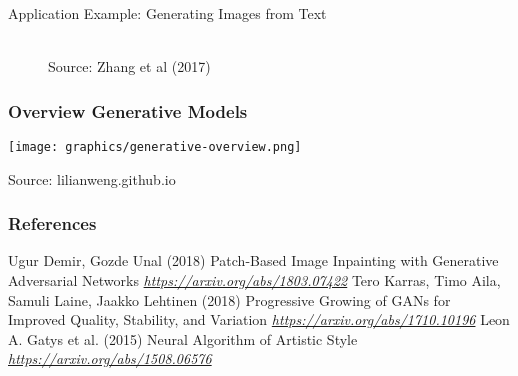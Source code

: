  \begin{frame} {Application Example: Generating Images from Text}
   
     \begin{figure}
     \centering
     \tiny{\\Source: Zhang et al (2017)}
     \end{figure}

 \end{frame}



    
\begin{frame}
    \frametitle{Overview Generative Models}
\texttt{[image: graphics/generative-overview.png]}\\
\hfill \begin{tiny}
Source: lilianweng.github.io
\end{tiny}
  \end{frame}
    

\begin{vbframe}
\frametitle{References}
\footnotesize{
\begin{thebibliography}{99}
 Ugur Demir, Gozde Unal (2018)
\newblock Patch-Based Image Inpainting with Generative Adversarial Networks
\newblock \emph{\url{https://arxiv.org/abs/1803.07422}}
 Tero Karras, Timo Aila, Samuli Laine, Jaakko Lehtinen (2018)
\newblock Progressive Growing of GANs for Improved Quality, Stability, and Variation
\newblock \emph{\url{https://arxiv.org/abs/1710.10196}}
 Leon A. Gatys et al. (2015)
\newblock Neural Algorithm of Artistic Style
\newblock \emph{\url{https://arxiv.org/abs/1508.06576}}



\end{thebibliography}
}
\end{vbframe}

\endlecture

